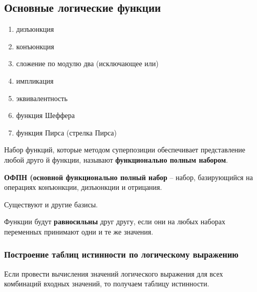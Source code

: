 \subsection*{Основные логические функции}

\begin{enumerate}
  \item дизъюнкция 
  \item конъюнкция 
  \item сложение по модулю два (исключающее или)
  \item импликация
  \item эквивалентность 
  \item функция Шеффера
  \item функция Пирса (стрелка Пирса)
\end{enumerate}


\begin{definition}
  Набор функций, которые методом суперпозиции обеспечивает представление любой друго й функции, называют \textbf{функционально полным набором}.
\end{definition}

\begin{definition}
  \textbf{ОФПН (основной функционально полный набор} -- набор, базирующийся на операциях конъюнкции, дизъюнкции и отрицания.
\end{definition}

Существуют и другие базисы.

\begin{definition}
  Функции будут \textbf{равносильны} друг другу, если они на любых наборах переменных принимают одни и те же значения.
\end{definition}

\subsubsection{Построение таблиц истинности по логическому выражению}

Если провести вычисления значений логического выражения для всех комбинаций входных значений, то получаем таблицу истинности.

